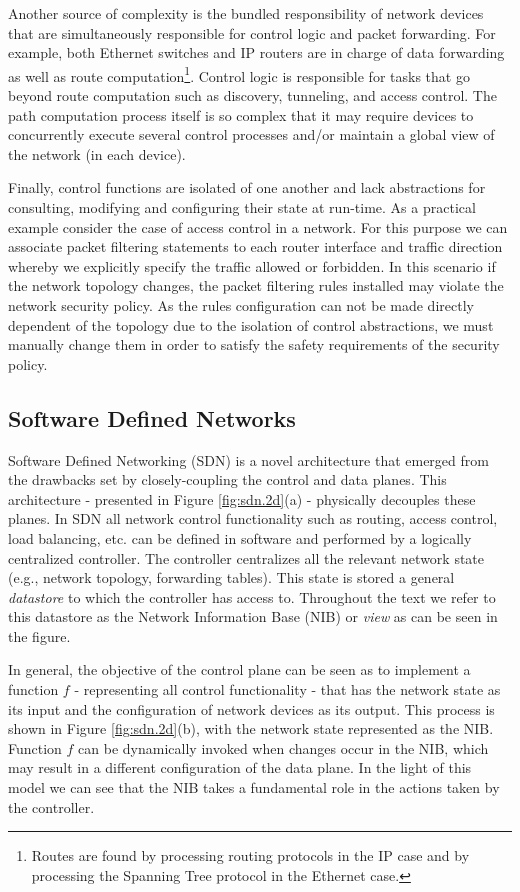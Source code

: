 Another source of complexity is the bundled responsibility  of network devices that are simultaneously responsible for control logic and packet forwarding. For example, both Ethernet  switches and IP routers are in charge of  data forwarding as well as route computation\footnote{Routes are found by processing routing protocols in the IP case and by processing the Spanning Tree protocol in the Ethernet case.}. Control logic is responsible for  tasks that go beyond route computation such as  discovery, tunneling, and  access control. The path computation process itself is so complex that it may require devices to concurrently execute several control processes and/or maintain a global view of the network (in each device).  

Finally, control functions are isolated of one another and lack
abstractions for consulting, modifying and configuring their state at
run-time. As a practical example consider the case of access control
in a network. For this purpose we can associate packet filtering
statements to each router interface and traffic direction whereby we
explicitly specify the traffic allowed or forbidden. In this scenario
if the network topology changes, the packet filtering rules installed
may violate  the network security policy. As the rules configuration
can not be made directly dependent of the topology due to the
isolation of control abstractions, we must manually change them in
order to satisfy the safety requirements of the security policy.  
\subsection{Software Defined Networks} 
 Software Defined Networking (SDN) is a novel architecture that emerged from the drawbacks set by closely-coupling the control and data planes. This architecture - presented in  Figure \ref{fig:sdn.2d}(a) - physically decouples these planes. In SDN all network control functionality  such as routing, access control, load balancing, etc. can be defined in software and performed by a logically centralized controller. The controller centralizes all the relevant network state (e.g., network topology, forwarding tables). This state is stored a general \emph{datastore} to which the controller has access to. Throughout the text we refer to this datastore as the Network Information Base (NIB) or \emph{view} as can be seen in the figure. 

In general, the objective of the control plane can be seen as to
implement a function $f$ - representing all control functionality -
that has the network state as its input and the configuration of
network devices as its output. This process is shown in Figure
\ref{fig:sdn.2d}(b), with the network state represented as the
NIB. Function $f$ can be dynamically invoked when changes occur in the
NIB, which may result in a different configuration of the data
plane. In the light of this model we can see that the NIB takes a
fundamental role in the actions taken by the controller. 

